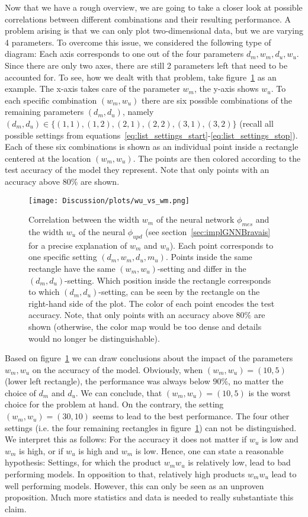 Now that we have a rough overview, we are going to take a closer look at possible 
correlations between different combinations and their resulting performance.
A problem arising is that we can only plot two-dimensional data, but we are varying 4 parameters.
To overcome this issue, we considered the following type of diagram: 
Each axis corresponds to one out of the four parameters $d_m,w_m,d_u,w_u$. 
Since there are only two axes, there are still 2 parameters left that need to be accounted for. 
To see, how we dealt with that problem, take figure~\ref{fig:wu_vs_wm} as an example. 
The x-axis takes care of the parameter $w_m$, the y-axis shows $w_u$. 
To each specific combination $(w_m,w_u)$ there are six possible combinations of the remaining parameters $(d_m,d_u)$, 
namely $(d_m,d_u)\in\{(1,1),(1,2),(2,1),(2,2),(3,1),(3,2)\}$ 
(recall all possible settings from equations~\ref{eq:list_settings_start}-\ref{eq:list_settings_stop}).
Each of these six combinations is shown as an individual point inside a rectangle centered at the location $(w_m,w_u)$.
The points are then colored according to the test accuracy of the model they represent. 
Note that only points with an accuracy above $80\%$ are shown.
\begin{figure}[h]
    \centering
    \texttt{[image: Discussion/plots/wu\_vs\_wm.png]}
    \caption{Correlation between the width $w_m$ of the neural network $\phi_{mes}$ and the width $w_u$ of the neural $\phi_{upd}$
    (see section~\ref{sec:implGNNBravais} for a precise explanation of $w_m$ and $w_u$).
    Each point corresponds to one specific setting $(d_m,w_m,d_u,m_u)$. Points inside the same rectangle have the same $(w_m,w_u)$-setting
    and differ in the $(d_m,d_u)$-setting. Which position inside the rectangle corresponds to which $(d_m,d_u)$-setting, can be seen by 
    the rectangle on the right-hand side of the plot. The color of each point encodes the test accuracy. Note, that only points with
    an accuracy above $80\%$ are shown (otherwise, the color map would be too dense and details would no longer be distinguishable). }
    \label{fig:wu_vs_wm}
\end{figure}
Based on figure~\ref{fig:wu_vs_wm} we can draw conclusions about the impact of the parameters $w_m,w_u$ on the accuracy of the model.
Obviously, when $(w_m,w_u)=(10,5)$ (lower left rectangle), the performance was always below 
$90\%$, no matter the choice of $d_m$ and $d_u$. 
We can conclude, that $(w_m,w_u)=(10,5)$ is the worst choice for the problem at hand.
On the contrary, the setting $(w_m,w_u)=(30,10)$ seems to lead to the best performance.
The four other settings (i.e. the four remaining rectangles in figure~\ref{fig:wu_vs_wm}) can not be distinguished.
We interpret this as follows: For the accuracy it does not matter if $w_u$ is low and $w_m$ is high, or if $w_u$ is high and $w_m$ is low.
Hence, one can state a reasonable hypothesis: Settings, for which the product $w_mw_u$ is relatively low, lead
to bad performing models. In opposition to that, relatively high products $w_mw_u$ lead to well performing models.
However, this can only be seen as an unproven proposition. 
Much more statistics and data is needed to really substantiate this claim.

